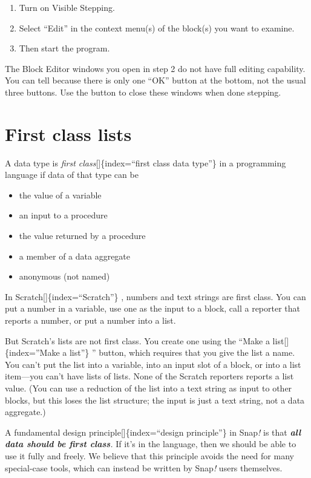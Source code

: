\documentclass[
  letterpaper,
]{book}
\begin{document}
\begin{enumerate}
\def\labelenumi{\arabic{enumi}.}
\item
  Turn on Visible Stepping.
\item
  Select ``Edit'' in the context menu(s) of the block(s) you want to
  examine.
\item
  Then start the program.
\end{enumerate}

The Block Editor windows you open in step 2 do not have full editing
capability. You can tell because there is only one ``OK'' button at the
bottom, not the usual three buttons. Use the button to close these
windows when done stepping.


\chapter{First class lists}\label{first-class-lists}

A data type is \emph{ﬁrst class}{[}{]}\{index=``first class data
type''\} in a programming language if data of that type can be

\begin{itemize}
\item
  the value of a variable
\item
  an input to a procedure
\item
  the value returned by a procedure
\item
  a member of a data aggregate
\item
  anonymous (not named)
\end{itemize}

In Scratch{[}{]}\{index=``Scratch''\} , numbers and text strings are
ﬁrst class. You can put a number in a variable, use one as the input to
a block, call a reporter that reports a number, or put a number into a
list.

But Scratch's lists are not ﬁrst class. You create one using the ``Make
a list{[}{]}\{index=''Make a list''\} '' button, which requires that you
give the list a name. You can't put the list into a variable, into an
input slot of a block, or into a list item---you can't have lists of
lists. None of the Scratch reporters reports a list value. (You can use
a reduction of the list into a text string as input to other blocks, but
this loses the list structure; the input is just a text string, not a
data aggregate.)

A fundamental design principle{[}{]}\{index=``design principle''\} in
Snap\emph{!} is that \emph{\textbf{all data should be ﬁrst class}.} If
it's in the language, then we should be able to use it fully and freely.
We believe that this principle avoids the need for many special-case
tools, which can instead be written by Snap\emph{!} users themselves.
\end{document}
